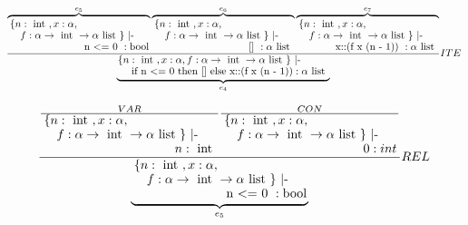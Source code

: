 \begin{equation}
	\frac
	{
        	      \overbrace{
        			\splitfrac
			{
        				\splitfrac
				{
					\{ n: \tauthree, x: \tautwo,
                         		}
                	        		{
 					f: \tauone \} \text{ |- }                         		
 				}
                         }
                	        {
                                 \text{ n <= 0 }: \text{bool}
                         }
               }^{e_5}
        	      \overbrace{
        			\splitfrac
			{
        				\splitfrac
				{
					\{ n: \tauthree, x: \tautwo,
                         		}
                	        		{
 					f: \tauone \} \text{ |- }                         		
 				}
                         }
                	        {
                                 \text{ [] }: \taufour
                         }
               }^{e_6}
        	      \overbrace{
        			\splitfrac
			{
        				\splitfrac
				{
					\{ n: \tauthree, x: \tautwo,
                         		}
                	        		{
 					f: \tauone \} \text{ |- }                         		
 				}
                         }
                	        {
                                 \text{ x::(f x (n - 1)) }: \taufour
                         }
               }^{e_7}
	} 
        {
        	      \underbrace{
        			\splitfrac
			{
				\{ n: \tauthree, x: \tautwo, f: \tauone \} \text{ |- }
                         }
                	        {
                                 \text{ if n <= 0 then [] else x::(f x (n - 1))}: \taufour
                         }
               }_{e_4}
	}
        {
            ITE
        }
\end{equation}

\begin{equation}
	\frac
	{
		\frac
		{
			VAR
		}
		{
        			\splitfrac
			{
        				\splitfrac
				{
					\{ n: \tauthree, x: \tautwo,
                 		}
                	       		{
 					f: \tauone \} \text{ |- }                         		
 				}
                 	}
           		{
                        		n: \tauthree
                 	}
		}
		\frac
		{
			CON
		}
		{
        			\splitfrac
			{
        				\splitfrac
				{
					\{ n: \tauthree, x: \tautwo,
                 		}
                	       		{
 					f: \tauone \} \text{ |- }                         		
 				}
                 	}
           		{
                        		0: int
                 	}
		}
	} 
        {
        	      \underbrace{
        			\splitfrac
			{
        				\splitfrac
				{
					\{ n: \tauthree, x: \tautwo,
                         		}
                	        		{
 					f: \tauone \} \text{ |- }                         		
 				}
                         }
                	        {
                                 \text{ n <= 0 }: \text{bool}
                         }
               }_{e_5}
	}
        {
            REL
        }
\end{equation}

